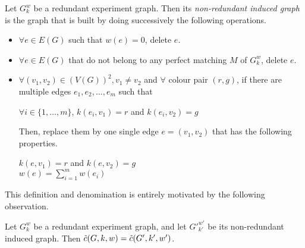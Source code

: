 \begin{definition}
    \label{def:non_redundant_induced_subgraph}
    Let $G_k^w$ be a redundant experiment graph. Then its \textit{non-redundant induced graph} is the graph that is built by doing successively the following operations.

    \begin{itemize}
        \item $\forall e \in E(G)$ such that $w(e) = 0$, delete $e$.
        \item $\forall e \in E(G)$ that do not belong to any perfect matching $M$ of $G_k^w$, delete $e$.
        \item $\forall (v_1, v_2) \in (V(G))^2, v_1 \neq v_2$ and $\forall$ colour pair $(r, g)$, if there are multiple edges $e_1, e_2, \dots, e_m$ such that 
        
        \begin{center}
            $\forall i \in \{1, \dots, m\}$, $k(e_i, v_1) = r$ and $k(e_i, v_2) = g$
        \end{center}
        Then, replace them by one single edge $e = (v_1, v_2)$ that has the following properties.
        
        \begin{center}
            $k(e, v_1) = r$ and $k(e, v_2) = g$ \\
            $w(e) = \sum\limits_{i = 1}^m w(e_i)$
        \end{center}
        
    \end{itemize}
    
\end{definition}

This definition and denomination is entirely motivated by the following observation.

\begin{observation}
    \label{obs:non_redundancy_enough}
    Let $G_k^w$ be a redundant experiment graph, and let ${G'}_{k'}^{w'}$ be its non-redundant induced graph. Then $\Tilde{c}(G, k, w) = \Tilde{c}(G', k', w')$.
\end{observation}

